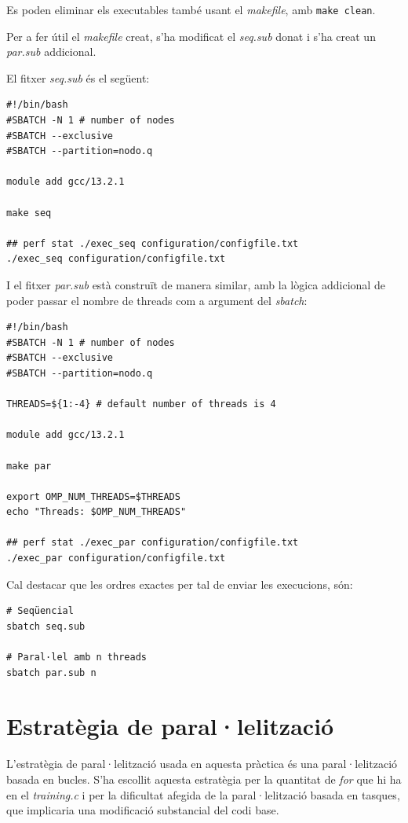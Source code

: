 \documentclass{article}
\begin{document}
Es poden eliminar els executables també usant el \textit{makefile}, amb \texttt{make clean}.

Per a fer útil el \textit{makefile} creat, s'ha modificat el \textit{seq.sub} donat i s'ha creat un \textit{par.sub} addicional.

El fitxer \textit{seq.sub} és el següent:
\begin{verbatim}
#!/bin/bash
#SBATCH -N 1 # number of nodes
#SBATCH --exclusive 
#SBATCH --partition=nodo.q

module add gcc/13.2.1

make seq

## perf stat ./exec_seq configuration/configfile.txt
./exec_seq configuration/configfile.txt
\end{verbatim}

I el fitxer \textit{par.sub} està construït de manera similar, amb la lògica addicional de poder passar el nombre de threads com a argument del \textit{sbatch}:
\begin{verbatim}
#!/bin/bash
#SBATCH -N 1 # number of nodes
#SBATCH --exclusive 
#SBATCH --partition=nodo.q

THREADS=${1:-4} # default number of threads is 4

module add gcc/13.2.1

make par

export OMP_NUM_THREADS=$THREADS
echo "Threads: $OMP_NUM_THREADS"

## perf stat ./exec_par configuration/configfile.txt
./exec_par configuration/configfile.txt
\end{verbatim}

\noindent Cal destacar que les ordres exactes per tal de enviar les execucions, són:

\begin{verbatim}
# Seqüencial
sbatch seq.sub

# Paral·lel amb n threads
sbatch par.sub n
\end{verbatim}

\newpage
\section{Estratègia de paral·lelització}

L'estratègia de paral·lelització usada en aquesta pràctica és una paral·lelització basada en bucles. 
S'ha escollit aquesta estratègia per la quantitat de \textit{for} que hi ha en el \textit{training.c} i per la dificultat afegida de la paral·lelització basada en tasques, que implicaria una modificació substancial del codi base.
\end{document}
